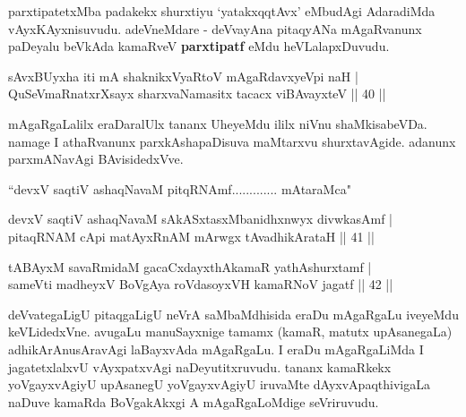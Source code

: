 \begin{artha}
parxtipatetxMba padakekx shurxtiyu `yatakxqqtAvx' eMbudAgi AdaradiMda 
vAyxKAyxnisuvudu. adeVneMdare - deVvayAna pitaqyANa mAgaRvanunx 
paDeyalu beVkAda kamaRveV \textbf{parxtipatf} eMdu heVLalapxDuvudu.
\end{artha}


\begin{shl}
sAvxBUyxha iti mA shaknikxVyaRtoV mAgaRdavxyeV\s pi naH | \\
QuSeVmaRnatxrXsayx sharxvaNamasitx tacacx viBAvayxteV \hfill|| 40 || 
\end{shl}

\begin{artha}
mAgaRgaLalilx eraDaralUlx tananx UheyeMdu ililx niVnu shaMkisabeVDa. 
namage I athaRvanunx parxkAshapaDisuva maMtarxvu shurxtavAgide. 
adanunx parxmANavAgi BAvisidedxVve.
\end{artha}


\begin{shl}
``devxV saqtiV ashaqNavaM pitqRNAmf............. mAtaraMca"
\end{shl}


\begin{shl}
devxV saqtiV ashaqNavaM sAkASxtasxMbanidhxnwyx divwkasAmf | \\
pitaqRNAM cApi matAyxRnAM mArwgx tAvadhikArataH \hfill|| 41 || 
\end{shl}

\begin{shl}
tABAyxM savaRmidaM gacaCxdayxthAkamaR yathAshurxtamf | \\
sameVti madheyxV BoVgAya roVdasoyxVH kamaRNoV jagatf \hfill|| 42 || 
\end{shl}

\begin{artha}
deVvategaLigU pitaqgaLigU neVrA saMbaMdhisida eraDu mAgaRgaLu iveyeMdu 
keVLidedxVne. avugaLu manuSayxnige tamamx (kamaR, matutx upAsanegaLa) 
adhikArAnusAravAgi laBayxvAda mAgaRgaLu. I eraDu mAgaRgaLiMda I 
jagatetxlalxvU vAyxpatxvAgi naDeyutitxruvudu. tananx kamaRkekx 
yoVgayxvAgiyU upAsanegU yoVgayxvAgiyU iruvaMte dAyxvApaqthivigaLa 
naDuve kamaRda BoVgakAkxgi A mAgaRgaLoMdige seVriruvudu.
\end{artha}

